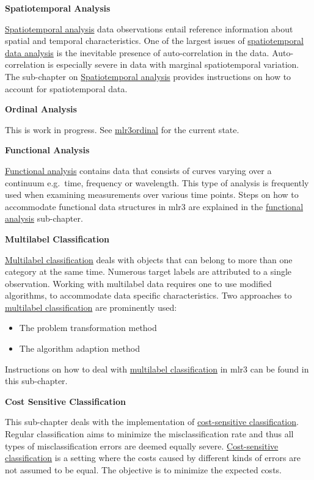 \documentclass[
]{scrbook}
\providecommand{\tightlist}{%
  \setlength{\itemsep}{0pt}\setlength{\parskip}{0pt}}
\begin{document}
\textbf{Spatiotemporal Analysis}

\protect\hyperlink{spatiotemporal}{Spatiotemporal analysis} data observations entail reference information about spatial and temporal characteristics.
One of the largest issues of \protect\hyperlink{spatiotemporal}{spatiotemporal data analysis} is the inevitable presence of auto-correlation in the data.
Auto-correlation is especially severe in data with marginal spatiotemporal variation.
The sub-chapter on \protect\hyperlink{spatiotemporal}{Spatiotemporal analysis} provides instructions on how to account for spatiotemporal data.

\textbf{Ordinal Analysis}

This is work in progress.
See \href{https://github.com/mlr-org/mlr3ordinal}{mlr3ordinal} for the current state.

\textbf{Functional Analysis}

\protect\hyperlink{functional}{Functional analysis} contains data that consists of curves varying over a continuum e.g.~time, frequency or wavelength.
This type of analysis is frequently used when examining measurements over various time points.
Steps on how to accommodate functional data structures in mlr3 are explained in the \protect\hyperlink{functional}{functional analysis} sub-chapter.

\textbf{Multilabel Classification}

\protect\hyperlink{multilabel}{Multilabel classification} deals with objects that can belong to more than one category at the same time.
Numerous target labels are attributed to a single observation.
Working with multilabel data requires one to use modified algorithms, to accommodate data specific characteristics.
Two approaches to \protect\hyperlink{multilabel}{multilabel classification} are prominently used:

\begin{itemize}
\tightlist
\item
  The problem transformation method
\item
  The algorithm adaption method
\end{itemize}

Instructions on how to deal with \protect\hyperlink{multilabel}{multilabel classification} in mlr3 can be found in this sub-chapter.

\textbf{Cost Sensitive Classification}

This sub-chapter deals with the implementation of \protect\hyperlink{cost-sens}{cost-sensitive classification}.
Regular classification aims to minimize the misclassification rate and thus all types of misclassification errors are deemed equally severe.
\protect\hyperlink{cost-sens}{Cost-sensitive classification} is a setting where the costs caused by different kinds of errors are not assumed to be equal.
The objective is to minimize the expected costs.
\end{document}
